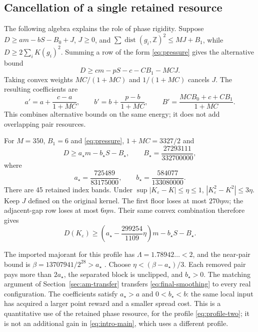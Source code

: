 \documentclass[11pt,reqno]{amsart}
\numberwithin{equation}{section}
\newcommand{\Z}{\mathbb Z}
\newcommand{\dist}{\operatorname{dist}}
\begin{document}
\subsection{Cancellation of a single retained resource}

The following algebra explains the role of phase rigidity. Suppose
$D\ge am-bS-B_0+J$, $J\ge0$, and
$\sum\dist(g_i,\Z)^2\le MJ+B_1$, while
$D\ge2\sum_iK(g_i)^2$. Summing a row of the form
\eqref{eq:pressure} gives the alternative bound
\[
 D\ge cm-pS-c-CB_1-MCJ.
\]
Taking convex weights $MC/(1+MC)$ and $1/(1+MC)$ cancels $J$.
The resulting coefficients are
\begin{equation}
 a'=a+\frac{c-a}{1+MC},\qquad
 b'=b+\frac{p-b}{1+MC},\qquad
 B'=\frac{MCB_0+c+CB_1}{1+MC}.
 \label{eq:bootstrap}
\end{equation}
This combines alternative bounds on the same energy; it does not add
overlapping pair resources.

For $M=350$, $B_1=6$ and \eqref{eq:pressure},
$1+MC=3327/2$ and
\begin{equation}
 D\ge a_\star m-b_\star S-B_\star,\qquad
 B_\star=\frac{27293111}{332700000},
 \label{eq:final-floor}
\end{equation}
where
\[
 a_\star=\frac{725489}{83175000},\qquad
 b_\star=\frac{584077}{133080000}.
\]
There are 45 retained index bands. Under
$\sup|K_\varepsilon-K|\le\eta\le1$,
$|K_\varepsilon^2-K^2|\le3\eta$.
Keep $J$ defined on the original kernel. The first floor loses at
most $270\eta m$; the adjacent-gap row loses at most $6\eta m$.
Their same convex combination therefore gives
\begin{equation}
 D(K_\varepsilon)\ge
 \left(a_\star-\frac{299254}{1109}\eta\right)m
 -b_\star S-B_\star.
 \label{eq:final-smoothing}
\end{equation}

The imported majorant for this profile has
$\Lambda=1.78942\ldots<2$, and the near-pair bound is
$\beta=13707941/2^{28}>a_\star$ \cite[Section 5]{Knausgard2026}.
Choose $\eta<(\beta-a_\star)/3$. Each removed pair pays more than
$2a_\star$, the separated block is unclipped, and $b_\star>0$.
The matching argument of Section~\ref{sec:am-transfer} transfers
\eqref{eq:final-smoothing} to every real configuration. The coefficients
satisfy $a_\star>a$ and $0<b_\star<b$: the same local input has acquired
a larger point reward and a smaller spread cost. This is a quantitative
use of the retained phase resource, for the profile
\eqref{eq:profile-two}; it is not an additional gain in
\eqref{eq:intro-main}, which uses a different profile.
\end{document}

